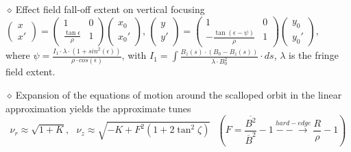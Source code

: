 \documentclass[12pt]{article}
\newcommand{\nid}{\noindent \ensuremath{\diamond~}}
\begin{document}
\begin{minipage}[b]{1.\linewidth}
\begin{minipage}[b]{.7\linewidth}
\nid Effect field fall-off extent on vertical focusing\\[1ex]
$ 
\left( \begin{array}{c}
 x \\ x' 
\end{array} \right)
=
\left(  \begin{array}{cc}
1 & 0 \\
\frac{\tan \epsilon}{\rho} & 1
\end{array}  \right)
\left( \begin{array}{c}
 x_0 \\ x_0' 
\end{array} \right)
$, 
$ 
\left( \begin{array}{c}
 y \\ y' 
\end{array} \right)
=
\left(  \begin{array}{cc}
1 & 0 \\
-\frac{\tan(\epsilon -\psi)}{\rho} & 1
\end{array}  \right)
\left( \begin{array}{c}
 y_0 \\ y_0' 
\end{array} \right)
$, \\[1ex]
where $\psi=\frac{I_1\cdot\lambda\cdot(1+sin^2(\epsilon))}{\rho\cdot cos(\epsilon)}$, 
with
$ I_1=\int \frac{B_z(s)\cdot(B_0-B_z(s))}{\lambda\cdot B_0^2}\cdot ds $, 
$\lambda$ is the fringe field extent. 




\medskip


\nid Expansion of the equations of motion around the scalloped orbit in the linear approximation  yields the 
approximate tunes 
 $$\nu_r \approx \sqrt{1 + K} , ~ ~ ~  \nu_z \approx  \sqrt{-K + F^2 (1 + 2\tan^2 \zeta)} \ \ \ 
(F = \frac{\overline{B^2}}{\overline{B}^2} - 1 ~  \stackrel{hard-edge}{-\!\!\!-\!\!\!\longrightarrow} ~ \frac{R}{\rho} -1)$$



\end{minipage}
\end{minipage}
\end{document}
